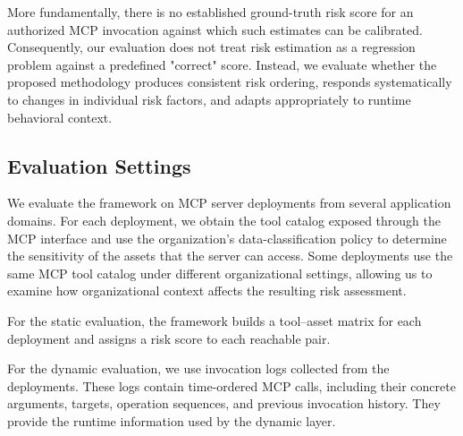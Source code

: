 \documentclass[sigconf]{acmart}
\begin{document}
More fundamentally, there is no established ground-truth risk score for an authorized MCP invocation against which such estimates can be calibrated. Consequently, our evaluation does not treat risk estimation as a regression problem against a predefined "correct" score. Instead, we evaluate whether the proposed methodology produces consistent risk ordering, responds systematically to changes in individual risk factors, and adapts appropriately to runtime behavioral context.




\subsection{Evaluation Settings}
\label{sec:evaluation-setting}


We evaluate the framework on MCP server deployments from several application
domains. For each deployment, we obtain the tool catalog exposed through the
MCP interface and use the organization's data-classification policy to
determine the sensitivity of the assets that the server can access. Some
deployments use the same MCP tool catalog under different organizational
settings, allowing us to examine how organizational context affects the
resulting risk assessment.

For the static evaluation, the framework builds a tool--asset matrix for
each deployment and assigns a risk score to each reachable pair.

For the dynamic evaluation, we use invocation logs collected from the
deployments. These logs contain time-ordered MCP calls, including their
concrete arguments, targets, operation sequences, and previous invocation
history. They provide the runtime information used by the dynamic layer.
\end{document}

